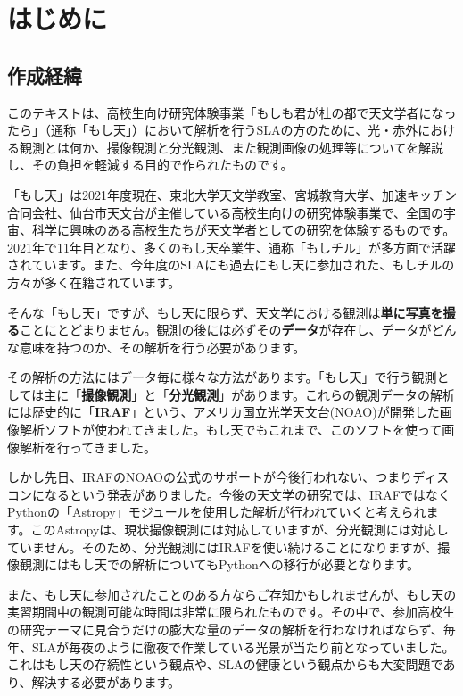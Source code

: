 \chapter{はじめに} %
\label{chap_1}
\section{作成経緯}%
\label{sec_1_1}
このテキストは、高校生向け研究体験事業「もしも君が杜の都で天文学者になったら」（通称「もし天」）において解析を行うSLAの方のために、光・赤外における観測とは何か、撮像観測と分光観測、また観測画像の処理等についてを解説し、その負担を軽減する目的で作られたものです。

「もし天」は2021年度現在、東北大学天文学教室、宮城教育大学、加速キッチン合同会社、仙台市天文台が主催している高校生向けの研究体験事業で、全国の宇宙、科学に興味のある高校生たちが天文学者としての研究を体験するものです\cite{moshiten}。2021年で11年目となり、多くのもし天卒業生、通称「もしチル」が多方面で活躍されています。また、今年度のSLAにも過去にもし天に参加された、もしチルの方々が多く在籍されています。

そんな「もし天」ですが、もし天に限らず、天文学における観測は\textbf{単に写真を撮る}ことにとどまりません。観測の後には必ずその\textbf{データ}が存在し、データがどんな意味を持つのか、その解析を行う必要があります。

その解析の方法にはデータ毎に様々な方法があります。「もし天」で行う観測としては主に「\textbf{撮像観測}」と「\textbf{分光観測}」があります。これらの観測データの解析には歴史的に「\textbf{IRAF}」\cite{iraf}という、アメリカ国立光学天文台(NOAO)が開発した画像解析ソフトが使われてきました。もし天でもこれまで、このソフトを使って画像解析を行ってきました。

しかし先日、IRAFのNOAOの公式のサポートが今後行われない、つまりディスコンになるという発表がありました。今後の天文学の研究では、IRAFではなくPythonの「Astropy」モジュールを使用した解析が行われていくと考えられます。このAstropyは、現状撮像観測には対応していますが、分光観測には対応していません。そのため、分光観測にはIRAFを使い続けることになりますが、撮像観測にはもし天での解析についてもPythonへの移行が必要となります。

また、もし天に参加されたことのある方ならご存知かもしれませんが、もし天の実習期間中の観測可能な時間は非常に限られたものです。その中で、参加高校生の研究テーマに見合うだけの膨大な量のデータの解析を行わなければならず、毎年、SLAが毎夜のように徹夜で作業している光景が当たり前となっていました。これはもし天の存続性という観点や、SLAの健康という観点からも大変問題であり、解決する必要があります。

